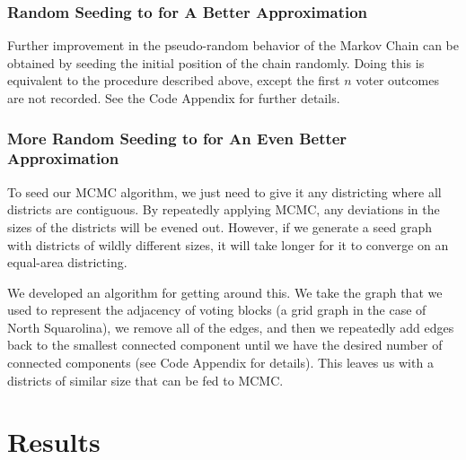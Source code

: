 \documentclass[12pt]{article}
\begin{document}
\subsubsection{Random Seeding to for A Better Approximation}
    Further improvement in the pseudo-random behavior of the Markov Chain can be obtained by seeding the initial position of the chain randomly. Doing this is equivalent to the procedure described above, except the first $n$ voter outcomes are not recorded. See the Code Appendix for further details.

\subsubsection{More Random Seeding to for An Even Better Approximation}
    To seed our MCMC algorithm, we just need to give it any districting where all districts are contiguous. By repeatedly applying MCMC, any deviations in the sizes of the districts will be evened out. However, if we generate a seed graph with districts of wildly different sizes, it will take longer for it to converge on an equal-area districting.
    \par We developed an algorithm for getting around this. We take the graph that we used to represent the adjacency of voting blocks (a grid graph in the case of North Squarolina), we remove all of the edges, and then we repeatedly add edges back to the smallest connected component until we have the desired number of connected components (see Code Appendix for details). This leaves us with a districts of similar size that can be fed to MCMC.

\section{Results}
\end{document}
